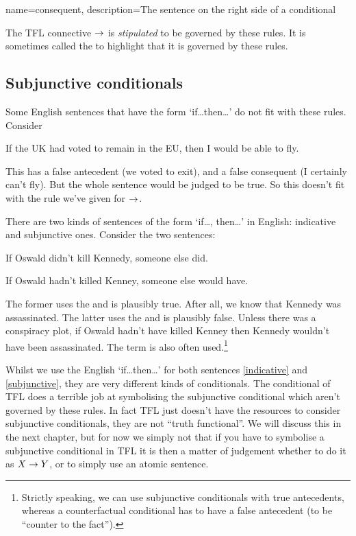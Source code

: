 {
name=consequent,
description={The sentence on the right side of a \gls{conditional}}
}

The TFL connective $\rightarrow$ is \emph{stipulated} to be governed by these rules. It is sometimes called the  to highlight that it is governed by these rules. 

\subsection{Subjunctive conditionals}
Some English sentences that have the form `if\ldots then\ldots' do not fit with these rules.
Consider 
\begin{earg}
\item[\ex{brexit}] If the UK had voted to remain in the EU, then I would be able to fly.
\end{earg}
This has a false antecedent (we voted to exit), and a false consequent (I certainly can't fly). But the whole sentence would be judged to be true. So this doesn't fit with the rule we've given for $\rightarrow$. 

There are two kinds of sentences of the form `if\ldots, then\ldots' in English: indicative and subjunctive ones. 
Consider the two sentences:
\begin{earg}
\item[\ex{indicative}] If Oswald didn't kill Kennedy, someone else did.
\item[\ex{subjunctive}] If Oswald hadn't killed Kenney, someone else would have.
\end{earg}
The former uses the  and is plausibly true. After all, we know that Kennedy was assassinated. The latter uses the  and is plausibly false. Unless there was a conspiracy plot, if Oswald hadn't have killed Kenney then Kennedy wouldn't have been assassinated. The term  is also often used.\footnote{Strictly speaking, we can use subjunctive conditionals with true antecedents, whereas a counterfactual conditional has to have a false antecedent (to be ``counter to the fact'').} 

Whilst we use the English `if\ldots then\ldots' for both sentences \ref{indicative} and \ref{subjunctive}, they are very different kinds of conditionals. The conditional of TFL does a terrible job at symbolising the subjunctive conditional which aren't governed by these rules. In fact TFL just doesn't have the resources to consider subjunctive conditionals, they are not ``truth functional''. We will discuss this in the next chapter, but for now we simply not that if you have to symbolise a subjunctive conditional in TFL it is then a matter of judgement whether to do it as $X\rightarrow Y$, or to simply use an atomic sentence. 

